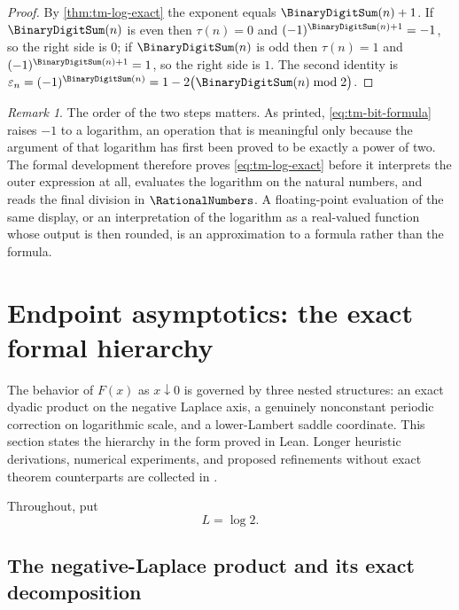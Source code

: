 \documentclass[11pt,oneside]{article}
\theoremstyle{definition}
\theoremstyle{remark}
\newtheorem{remark}[theorem]{Remark}
\begin{document}
\begin{proof}
By \cref{thm:tm-log-exact} the exponent equals $\BinaryDigitSum(n)+1$.  If $\BinaryDigitSum(n)$ is even then
$\tau(n)=0$ and $(-1)^{\BinaryDigitSum(n)+1}=-1$, so the right side is $0$; if $\BinaryDigitSum(n)$ is odd then
$\tau(n)=1$ and $(-1)^{\BinaryDigitSum(n)+1}=1$, so the right side is $1$.  The second identity is
$\varepsilon_n=(-1)^{\BinaryDigitSum(n)}=1-2\bigl(\BinaryDigitSum(n)\bmod2\bigr)$.
\end{proof}

\begin{remark}
The order of the two steps matters.  As printed, \eqref{eq:tm-bit-formula} raises $-1$ to a
logarithm, an operation that is meaningful only because the argument of that logarithm has
first been proved to be exactly a power of two.  The formal development therefore proves
\eqref{eq:tm-log-exact} before it interprets the outer expression at all, evaluates the
logarithm on the natural numbers, and reads the final division in $\RationalNumbers$.  A floating-point
evaluation of the same display, or an interpretation of the logarithm as a real-valued
function whose output is then rounded, is an approximation to a formula rather than the
formula.
\end{remark}

\section{Endpoint asymptotics: the exact formal hierarchy}
\label{sec:asymptotic-decomposition}

The behavior of \(F(x)\) as \(x\downarrow0\) is governed by three nested structures: an
exact dyadic product on the negative Laplace axis, a genuinely nonconstant periodic
correction on logarithmic scale, and a lower-Lambert saddle coordinate.  This section
states the hierarchy in the form proved in Lean.  Longer heuristic derivations, numerical
experiments, and proposed refinements without exact theorem counterparts are collected in
.

Throughout, put
\begin{equation}
 L=\log 2.                                                   \label{eq:L-def}
\end{equation}

\subsection{The negative-Laplace product and its exact decomposition}
\end{document}
